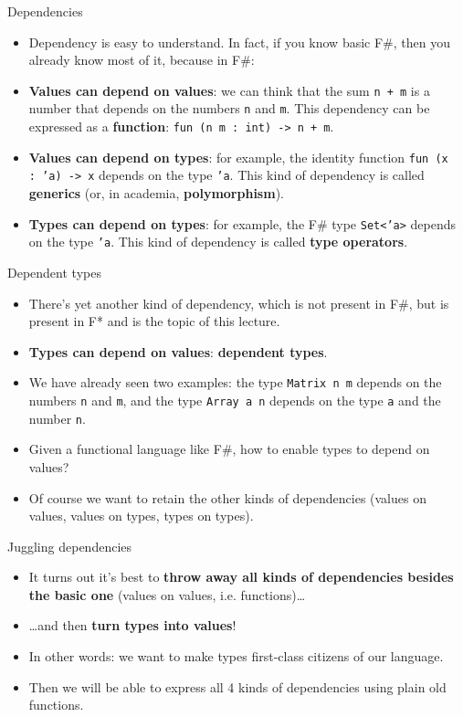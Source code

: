 \documentclass{beamer}
\newcommand{\m}[1]{\texttt{#1}}
\begin{document}
\begin{frame}{Dependencies}
\begin{itemize}
	\item Dependency is easy to understand. In fact, if you know basic F\#, then you already know most of it, because in F\#:
	\item \textbf{Values can depend on values}: we can think that the sum \m{n + m} is a number that depends on the numbers \m{n} and \m{m}. This dependency can be expressed as a \textbf{function}: \m{fun (n m :\ int) -> n + m}.
	\item \textbf{Values can depend on types}: for example, the identity function \m{fun (x :\ 'a) -> x} depends on the type \m{'a}. This kind of dependency is called \textbf{generics} (or, in academia, \textbf{polymorphism}).
	\item \textbf{Types can depend on types}: for example, the F\# type \m{Set<'a>} depends on the type \m{'a}. This kind of dependency is called \textbf{type operators}.
\end{itemize}
\end{frame}

\begin{frame}{Dependent types}
\begin{itemize}
	\item There's yet another kind of dependency, which is not present in F\#, but is present in F* and is the topic of this lecture.
	\item \textbf{Types can depend on values}: \textbf{dependent types}.
	\item We have already seen two examples: the type \m{Matrix n m} depends on the numbers \m{n} and \m{m}, and the type \m{Array a n} depends on the type \m{a} and the number \m{n}.
	\item Given a functional language like F\#, how to enable types to depend on values?
	\item Of course we want to retain the other kinds of dependencies (values on values, values on types, types on types).
\end{itemize}
\end{frame}

\begin{frame}{Juggling dependencies}
\begin{itemize}
	\item It turns out it's best to \textbf{throw away all kinds of dependencies besides the basic one} (values on values, i.e. functions)\dots
	\item \dots and then \textbf{turn types into values}!
	\item In other words: we want to make types first-class citizens of our language.
	\item Then we will be able to express all 4 kinds of dependencies using plain old functions.
\end{itemize}
\end{frame}
\end{document}
